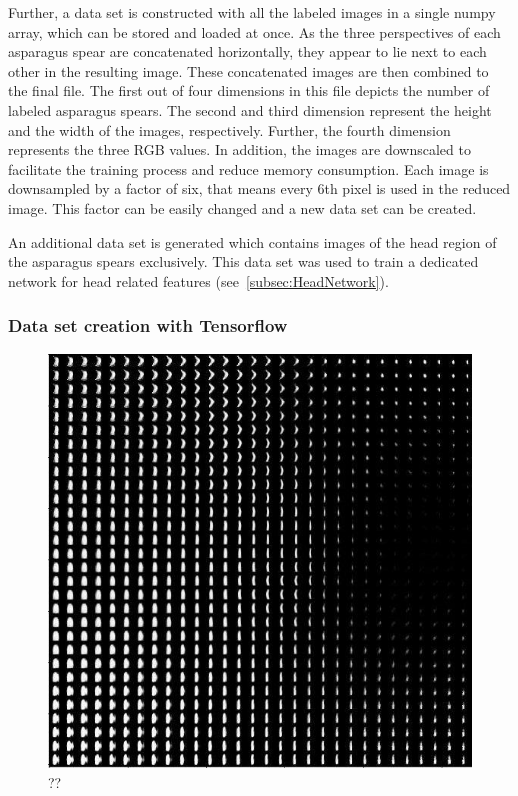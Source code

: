 Further, a data set is constructed with all the labeled images in a single numpy array, which can be stored and loaded at once. As the three perspectives of each asparagus spear are concatenated horizontally, they appear to lie next to each other in the resulting image. These concatenated images are then combined to the final file. The first out of four dimensions in this file depicts the number of labeled asparagus spears. The second and third dimension represent the height and the width of the images, respectively. Further, the fourth dimension represents the three RGB values.
In addition, the images are downscaled to facilitate the training process and reduce memory consumption. Each image is downsampled by a factor of six, that means every 6th pixel is used in the reduced image. This factor can be easily changed and a new data set can be created. 

An additional data set is generated which contains images of the head region of the asparagus spears exclusively. This data set was used to train a dedicated network for head related features (see~\autoref{subsec:HeadNetwork}).


\subsubsection{Data set creation with Tensorflow}
\label{subsec:DataSetTheory}

\begin{figure}[!ht]
	\centering
	\includegraphics[scale=0.55]{Figures/chapter03/latent-space-square.png}
	\decoRule
	\caption[??]{??}
	\label{fig:LatentSquare}
\end{figure}

